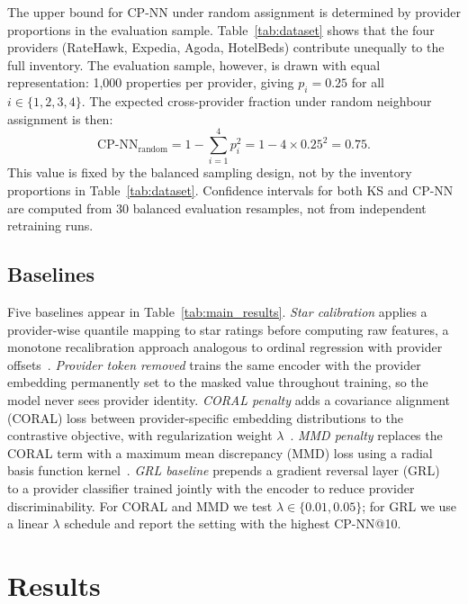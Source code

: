 \documentclass[conference,a4paper]{IEEEtran}
\begin{document}
The upper bound for CP-NN under random assignment is determined by provider proportions in the evaluation sample. Table~\ref{tab:dataset} shows that the four providers (RateHawk, Expedia, Agoda, HotelBeds) contribute unequally to the full inventory. The evaluation sample, however, is drawn with equal representation: 1{,}000 properties per provider, giving $p_i=0.25$ for all $i\in\{1,2,3,4\}$. The expected cross-provider fraction under random neighbour assignment is then:
\begin{equation}
\mathrm{CP\mbox{-}NN}_{\mathrm{random}}=1-\sum_{i=1}^{4} p_i^2=1-4\times0.25^2=0.75.
\label{eq:random}
\end{equation}
This value is fixed by the balanced sampling design, not by the inventory proportions in Table~\ref{tab:dataset}. Confidence intervals for both KS and CP-NN are computed from 30 balanced evaluation resamples, not from independent retraining runs.

\subsection{Baselines}

Five baselines appear in Table~\ref{tab:main_results}. \textit{Star calibration} applies a provider-wise quantile mapping to star ratings before computing raw features, a monotone recalibration approach analogous to ordinal regression with provider offsets~\cite{mccullagh1980regression}. \textit{Provider token removed} trains the same encoder with the provider embedding permanently set to the masked value throughout training, so the model never sees provider identity. \textit{CORAL penalty} adds a covariance alignment (CORAL) loss between provider-specific embedding distributions to the contrastive objective, with regularization weight $\lambda$~\cite{sun2016coral}. \textit{MMD penalty} replaces the CORAL term with a maximum mean discrepancy (MMD) loss using a radial basis function kernel~\cite{gretton2012kernel}. \textit{GRL baseline} prepends a gradient reversal layer (GRL)~\cite{ganin2015unsupervised} to a provider classifier trained jointly with the encoder to reduce provider discriminability. For CORAL and MMD we test $\lambda\in\{0.01,0.05\}$; for GRL we use a linear $\lambda$ schedule and report the setting with the highest CP-NN@10.

\section{Results}
\end{document}

